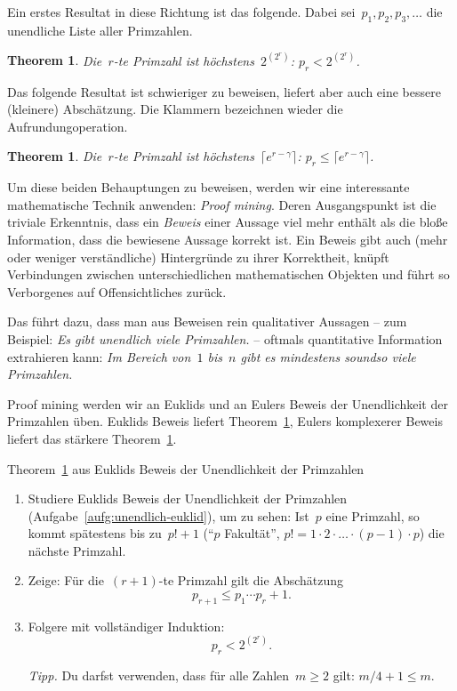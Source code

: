 \documentclass[twoside]{../zirkelblatt1415}
\theoremstyle{definition}
\theoremstyle{plain}
\newtheorem{thm}[defn]{Theorem}
\theoremstyle{remark}
\begin{document}
Ein erstes Resultat in diese Richtung ist das folgende. Dabei
sei~$p_1,p_2,p_3,\ldots$ die unendliche Liste aller Primzahlen.

\begin{thm}\label{thm:schranke1}
Die~$r$-te Primzahl ist höchstens~$2^{(2^r)}$: $p_r < 2^{(2^r)}$.
\end{thm}

Das folgende Resultat ist schwieriger zu beweisen, liefert aber auch eine
bessere (kleinere) Abschätzung. Die Klammern bezeichnen wieder die
Aufrundungoperation.

\begin{thm}\label{thm:schranke2}
Die~$r$-te Primzahl ist höchstens~$\lceil e^{r-\gamma} \rceil$: $p_r
\leq \lceil e^{r-\gamma} \rceil$.
\end{thm}

Um diese beiden Behauptungen zu beweisen, werden wir eine interessante
mathematische Technik anwenden: \emph{Proof mining}. Deren Ausgangspunkt ist
die triviale Erkenntnis, dass ein \emph{Beweis} einer Aussage viel mehr enthält
als die bloße Information, dass die bewiesene Aussage korrekt ist. Ein Beweis
gibt auch (mehr oder weniger verständliche) Hintergründe zu ihrer Korrektheit,
knüpft Verbindungen zwischen unterschiedlichen mathematischen Objekten und
führt so Verborgenes auf Offensichtliches zurück.

Das führt dazu, dass man aus Beweisen rein qualitativer Aussagen -- zum
Beispiel: \emph{Es gibt unendlich viele Primzahlen.} -- oftmals quantitative
Information extrahieren kann: \emph{Im Bereich von~$1$ bis~$n$ gibt es
mindestens soundso viele Primzahlen.}

Proof mining werden wir an Euklids und an Eulers Beweis der Unendlichkeit der
Primzahlen üben. Euklids Beweis liefert Theorem~\ref{thm:schranke1}, Eulers
komplexerer Beweis liefert das stärkere Theorem~\ref{thm:schranke2}.

\begin{aufgabe}{Theorem~\ref{thm:schranke1} aus Euklids Beweis der
Unendlichkeit der Primzahlen}
\begin{enumerate}
\item Studiere Euklids Beweis der Unendlichkeit der Primzahlen
(Aufgabe~\ref{aufg:unendlich-euklid}), um zu sehen: Ist~$p$ eine Primzahl, so
kommt spätestens bis zu~$p! + 1$ ("`$p$ Fakultät"', $p! = 1 \cdot 2 \cdot
\ldots \cdot (p-1) \cdot p$) die nächste Primzahl.
\item Zeige: Für die~$(r+1)$-te Primzahl gilt die Abschätzung
\[ p_{r+1} \leq p_1 \cdots p_r + 1. \]
\item Folgere mit vollständiger Induktion:
\[ p_r < 2^{(2^r)}. \]

\emph{Tipp.} Du darfst verwenden, dass für alle Zahlen~$m \geq 2$ gilt: $m/4 +
1 \leq m$.
\end{enumerate}\fixlistspacing
\end{aufgabe}
\end{document}
